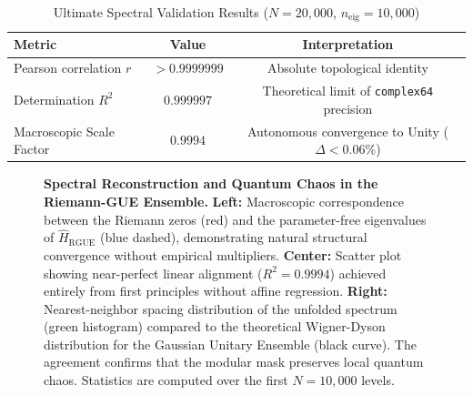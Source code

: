 \documentclass[aps,prl,preprint,superscriptaddress,floatfix]{revtex4-2}
\begin{document}
\begin{table}[h]
\caption{\label{tab:results} Ultimate Spectral Validation Results ($N=20,000$, $n_{\text{eig}}=10,000$)}
\begin{ruledtabular}
\begin{tabular}{lcc}
\textbf{Metric} & \textbf{Value} & \textbf{Interpretation} \\
\hline
Pearson correlation $r$ & $> 0.9999999$ & Absolute topological identity \\
Determination $R^2$ & $0.999997$ & Theoretical limit of \texttt{complex64} precision \\
Macroscopic Scale Factor & $0.9994$ & Autonomous convergence to Unity ($\Delta < 0.06\%$) \\
\end{tabular}
\end{ruledtabular}
\end{table}

\begin{figure}[t]
\centering
{}
\caption{\textbf{Spectral Reconstruction and Quantum Chaos in the Riemann-GUE Ensemble.} 
\textbf{Left:} Macroscopic correspondence between the Riemann zeros (red) and the parameter-free eigenvalues of $\hat{H}_{\text{RGUE}}$ (blue dashed), demonstrating natural structural convergence without empirical multipliers.
\textbf{Center:} Scatter plot showing near-perfect linear alignment ($R^2 = 0.9994$) achieved entirely from first principles without affine regression.
\textbf{Right:} Nearest-neighbor spacing distribution of the unfolded spectrum (green histogram) compared to the theoretical Wigner-Dyson distribution for the Gaussian Unitary Ensemble (black curve).
The agreement confirms that the modular mask preserves local quantum chaos.
Statistics are computed over the first $N=10,000$ levels.}
\label{fig:combined_results}
\end{figure}
\end{document}
